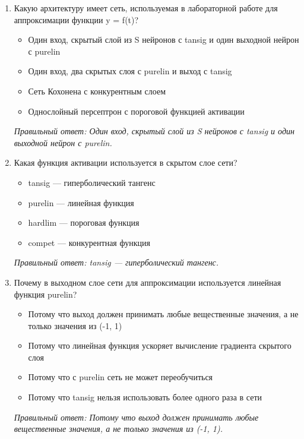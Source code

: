 \small
\begin{enumerate}[label=\textbf{\arabic*.}, leftmargin=0pt, itemsep=1.2em]
\item Какую архитектуру имеет сеть, используемая в лабораторной работе для аппроксимации функции y = f(t)?
\begin{itemize}[label=$\square$, leftmargin=1.5cm, itemsep=0.2em, topsep=0.3em]
\item Один вход, скрытый слой из S нейронов с tansig и один выходной нейрон с purelin
\item Один вход, два скрытых слоя с purelin и выход с tansig
\item Сеть Кохонена с конкурентным слоем
\item Однослойный персептрон с пороговой функцией активации
\end{itemize}
{\small\textit{Правильный ответ: Один вход, скрытый слой из S нейронов с tansig и один выходной нейрон с purelin.}}

\item Какая функция активации используется в скрытом слое сети?
\begin{itemize}[label=$\square$, leftmargin=1.5cm, itemsep=0.2em, topsep=0.3em]
\item tansig — гиперболический тангенс
\item purelin — линейная функция
\item hardlim — пороговая функция
\item compet — конкурентная функция
\end{itemize}
{\small\textit{Правильный ответ: tansig — гиперболический тангенс.}}

\item Почему в выходном слое сети для аппроксимации используется линейная функция purelin?
\begin{itemize}[label=$\square$, leftmargin=1.5cm, itemsep=0.2em, topsep=0.3em]
\item Потому что выход должен принимать любые вещественные значения, а не только значения из (-1, 1)
\item Потому что линейная функция ускоряет вычисление градиента скрытого слоя
\item Потому что с purelin сеть не может переобучиться
\item Потому что tansig нельзя использовать более одного раза в сети
\end{itemize}
{\small\textit{Правильный ответ: Потому что выход должен принимать любые вещественные значения, а не только значения из (-1, 1).}}


\end{enumerate}
